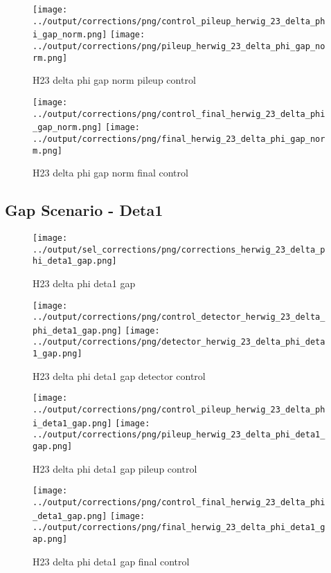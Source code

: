 \documentclass[11pt]{book}
\begin{document}
\begin{figure}[ht]
\centering
\texttt{[image: ../output/corrections/png/control\_pileup\_herwig\_23\_delta\_phi\_gap\_norm.png]}
\texttt{[image: ../output/corrections/png/pileup\_herwig\_23\_delta\_phi\_gap\_norm.png]}
\caption{H23 delta phi gap norm pileup control}
\label{fig:H23_delta_phi_gap_norm_pileup_control}
\end{figure}


\begin{figure}[ht]
\centering
\texttt{[image: ../output/corrections/png/control\_final\_herwig\_23\_delta\_phi\_gap\_norm.png]}
\texttt{[image: ../output/corrections/png/final\_herwig\_23\_delta\_phi\_gap\_norm.png]}
\caption{H23 delta phi gap norm final control}
\label{fig:H23_delta_phi_gap_norm_final_control}
\end{figure}

\clearpage
\subsection{Gap Scenario - Deta1}
\begin{figure}[ht]
\centering
\texttt{[image: ../output/sel\_corrections/png/corrections\_herwig\_23\_delta\_phi\_deta1\_gap.png]}
\caption{H23 delta phi deta1 gap}
\label{fig:H23_delta_phi_deta1_gap}
\end{figure}

\begin{figure}[ht]
\centering
\texttt{[image: ../output/corrections/png/control\_detector\_herwig\_23\_delta\_phi\_deta1\_gap.png]}
\texttt{[image: ../output/corrections/png/detector\_herwig\_23\_delta\_phi\_deta1\_gap.png]}
\caption{H23 delta phi deta1 gap detector control}
\label{fig:H23_delta_phi_deta1_gap_detector_control}
\end{figure}

\begin{figure}[ht]
\centering
\texttt{[image: ../output/corrections/png/control\_pileup\_herwig\_23\_delta\_phi\_deta1\_gap.png]}
\texttt{[image: ../output/corrections/png/pileup\_herwig\_23\_delta\_phi\_deta1\_gap.png]}
\caption{H23 delta phi deta1 gap pileup control}
\label{fig:H23_delta_phi_deta1_gap_pileup_control}
\end{figure}


\begin{figure}[ht]
\centering
\texttt{[image: ../output/corrections/png/control\_final\_herwig\_23\_delta\_phi\_deta1\_gap.png]}
\texttt{[image: ../output/corrections/png/final\_herwig\_23\_delta\_phi\_deta1\_gap.png]}
\caption{H23 delta phi deta1 gap final control}
\label{fig:H23_delta_phi_deta1_gap_final_control}
\end{figure}
\end{document}
